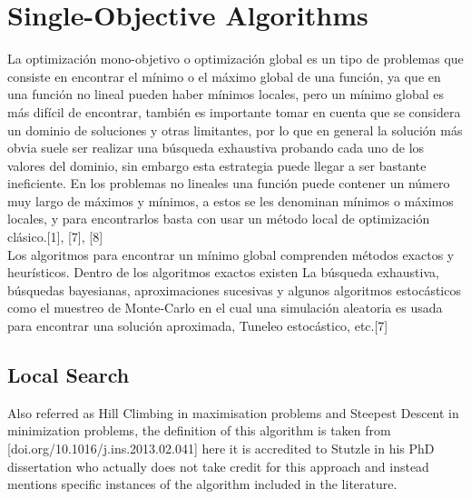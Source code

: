 \section{Single-Objective Algorithms}



La optimización mono-objetivo o optimización global es un tipo de problemas que consiste en encontrar el mínimo o el máximo global de una función, ya que en una función no lineal pueden haber mínimos locales, pero un mínimo global es más difícil de encontrar, también es importante tomar en cuenta que se considera un dominio de soluciones y otras limitantes, por lo que en general la solución más obvia suele ser realizar una búsqueda exhaustiva probando cada uno de los valores del dominio, sin embargo esta estrategia puede llegar a ser bastante ineficiente. En los problemas no lineales una función puede contener un número muy largo de máximos y mínimos, a estos se les denominan mínimos o máximos locales, y para encontrarlos basta con usar un método local de optimización clásico.[1], [7], [8] \\

Los algoritmos para encontrar un mínimo global comprenden métodos exactos y heurísticos. Dentro de los algoritmos exactos existen La búsqueda exhaustiva, búsquedas bayesianas, aproximaciones sucesivas y algunos algoritmos estocásticos como el muestreo de Monte-Carlo en el cual una simulación aleatoria es usada para encontrar una solución aproximada, Tuneleo estocástico, etc.[7] \\

\subsection{Local Search}
 
Also referred as Hill Climbing in maximisation problems and Steepest Descent in minimization problems, the definition of this algorithm is taken from [doi.org/10.1016/j.ins.2013.02.041] here it is accredited to Stutzle in his PhD dissertation who actually does not take credit for this approach and instead mentions specific instances of the algorithm included in the literature.\\

